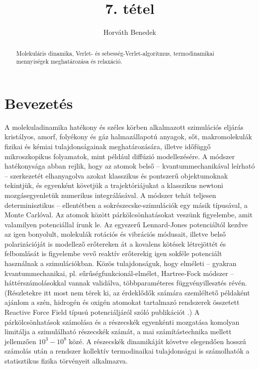 \documentclass[12pt]{article}
\theoremstyle{plain}
\begin{document}
\title{7. tétel}
\author{Horváth Benedek}

\maketitle


\newpage
\begin{abstract}
    Molekuláris dinamika, Verlet- és sebesség-Verlet-algoritmus, termodinamikai mennyiségek meghatározása és relaxáció.
\end{abstract}


\section{Bevezetés}

A molekuladinamika hatékony és széles körben alkalmazott szimulációs eljárás kristályos, amorf, folyékony és gáz halmazállapotú anyagok, sőt, makromolekulák fizikai és kémiai tulajdonságainak meghatározására, illetve időfüggő mikroszkopikus folyamatok, mint például diffúzió modellezésére. A módszer hatékonysága abban rejlik, hogy az atomok belső -- kvantummechanikával leírható -- szerkezetét elhanyagolva azokat klasszikus és pontszerű objektumoknak tekintjük, és egyenként követjük a trajektóriájukat a klasszikus newtoni mozgásegyenletük numerikus integrálásával. A módszer tehát teljesen determinisztikus -- ellentétben a sokrészecske-szimulációk egy másik típusával, a Monte Carlóval. Az atomok között párkölcsönhatásokat veszünk figyelembe, amit valamilyen potenciállal írunk le. Az egyszerű Lennard-Jones potenciáltól kezdve az igen bonyolult, molekulák rotációs és vibrációs módusait, illetve belső polarizációját is modellező erőtereken át a kovalens kötések létrejöttét és felbomlását is figyelembe vevő reaktív erőterekig igen sokféle potenciált használnak a szimulációkban. Közös tulajdonságuk, hogy elméleti -- gyakran kvantummechanikai, pl. sűrűségfunkcionál-elmélet, Hartree-Fock módszer -- háttérszámolásokkal vannak validálva, többparaméteres függvényillesztés révén. (Részletekre itt most nem térek ki, az érdeklődők számára szemléltető példaként ajánlom a szén, hidrogén és oxigén atomokat tartalmazó rendszerek összetett Reactive Force Field típusú potenciáljáról szóló publikációt \cite{KimberlyChenoweth2008}.) A párkölcsönhatások számolása és a részecskék egyenkénti mozgatása komolyan limitálja a szimulálható részecskék számát, a mai számítástechnika mellett jellemzően $10^3-10^8$ közé. A részecskék dinamikáját követve elegendően hosszú számolás után a rendszer kollektív termodinaikai tulajdonságai is számolhatók a statisztikus fizika törvényeit alkalmazva.
\end{document}
